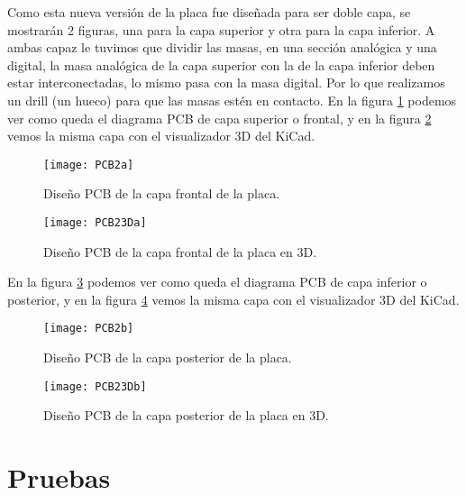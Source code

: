 Como esta nueva versión de la placa fue diseñada para ser doble capa, se mostrarán 2 figuras, una para la capa superior y otra para la capa inferior. 
A ambas capaz le tuvimos que dividir las masas, en una sección analógica y una digital, la masa analógica de la capa superior con la de la capa inferior deben estar interconectadas, lo mismo pasa con la masa digital. Por lo que realizamos un drill (un hueco) para que las masas estén en contacto.
En la figura \ref{fig:PCB2a} podemos ver como queda el diagrama PCB de capa superior o frontal, y en la figura \ref{fig:PCB23Da} vemos la misma capa con el visualizador 3D del KiCad.

\begin{figure}[H]
\centering
  \texttt{[image: PCB2a]}
  \caption{Diseño PCB de la capa frontal de la placa.}\label{fig:PCB2a}
\end{figure}

\begin{figure}  [H]
\centering
  \texttt{[image: PCB23Da]}
  \caption{Diseño PCB de la capa frontal de la placa en 3D.}\label{fig:PCB23Da}
\end{figure}

En la figura \ref{fig:PCB2b} podemos ver como queda el diagrama PCB de capa inferior o posterior, y en la figura \ref{fig:PCB23Db} vemos la misma capa con el visualizador 3D del KiCad.

\begin{figure}[H] 
\centering
  \texttt{[image: PCB2b]}
  \caption{Diseño PCB de la capa posterior de la placa.}\label{fig:PCB2b}
\end{figure}

\begin{figure}  [H]
\centering
  \texttt{[image: PCB23Db]}
  \caption{Diseño PCB de la capa posterior de la placa en 3D.}\label{fig:PCB23Db}
\end{figure}



\section{Pruebas} %
\label{sec:pruebas}

